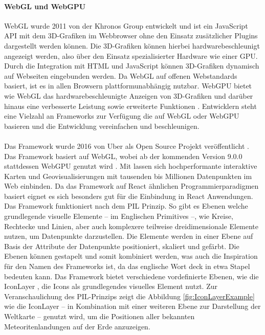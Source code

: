 \paragraph{WebGL und WebGPU}
\ac{WebGL} wurde 2011 von der Khronos Group entwickelt und ist ein JavaScript \ac{API} mit dem 3D-Grafiken im Webbrowser ohne den Einsatz zusätzlicher Plugins dargestellt werden können. Die 3D-Grafiken können hierbei hardwarebeschleunigt angezeigt werden, also über den Einsatz spezialisierter Hardware wie einer \ac{GPU}. Durch die Integration mit \ac{HTML} und JavaScript können 3D-Grafiken dynamisch auf Webseiten eingebunden werden. Da \ac{WebGL} auf offenen Webstandards basiert, ist es in allen Browsern plattformunabhängig nutzbar.\cite[S.~17-19]{Parisi2014} WebGPU bietet wie \ac{WebGL} das hardwarebeschleunigte Anzeigen von 3D-Grafiken und darüber hinaus eine verbesserte Leistung sowie erweiterte Funktionen \cite{Surma2022}. Entwicklern steht eine Vielzahl an Frameworks zur Verfügung die auf \ac{WebGL} oder WebGPU basieren \cite{Seguin2024} und die Entwicklung vereinfachen und beschleunigen.

\paragraph{\deckgl{}}
Das Framework \deckgl{} wurde 2016 von Uber als Open Source Projekt veröffentlicht \cite{Visgl}. Das Framework basiert auf \ac{WebGL}, wobei ab der kommenden Version 9.0.0 stattdessen WebGPU genutzt wird \cite{Green2022}. Mit \deckgl{} lassen sich hochperformante interaktive Karten und Geovisualisierungen mit tausenden bis Millionen Datenpunkten im Web einbinden. Da das Framework auf React ähnlichen Programmierparadigmen basiert eignet es sich besonders gut für die Einbindung in React Anwendungen. Das Framework funktioniert nach dem \ac{PIL} Prinzip. So gibt es Ebenen welche grundlegende visuelle Elemente – im Englischen Primitives –, wie Kreise, Rechtecke und Linien, aber auch komplexere teilweise dreidimensionale Elemente nutzen, um Datenpunkte darzustellen. Die Elemente werden in einer Ebene auf Basis der Attribute der Datenpunkte positioniert, skaliert und gefärbt. Die Ebenen können gestapelt und somit kombiniert werden, was auch die Inspiration für den Namen des Frameworks ist, da das englische Wort deck in etwa Stapel bedeuten kann.\cite[S.~2]{YangWang2019} Das Framework bietet verschiedene vordefinierte Ebenen, wie die IconLayer \cite{DeckglIconLayer}, die Icons als grundlegendes visuelles Element nutzt. Zur Veranschaulichung des \ac{PIL}-Prinzips zeigt die Abbildung \ref{fig:IconLayerExample} wie die IconLayer – in Kombination mit einer weiteren Ebene zur Darstellung der Weltkarte – genutzt wird, um die Positionen aller bekannten Meteoritenlandungen auf der Erde anzuzeigen.

